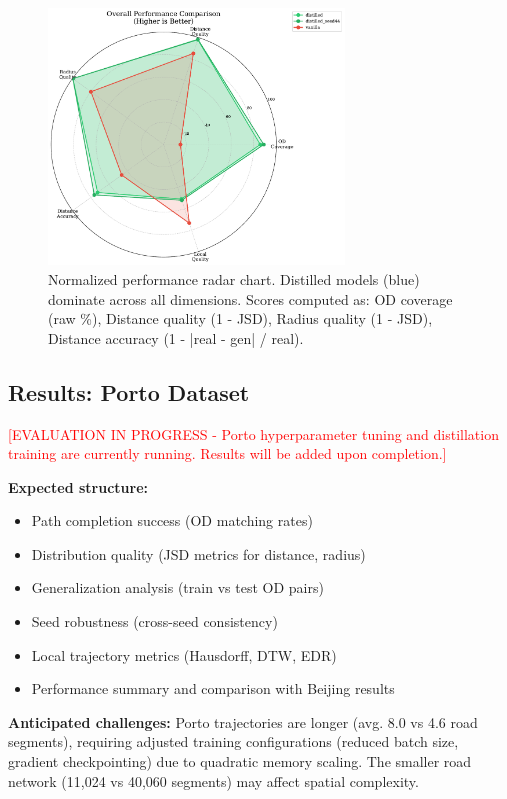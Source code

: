 \begin{figure}[h]
\centering
\includegraphics[width=0.7\textwidth]{assets/plots/hoser/performance_radar.pdf}
\caption{Normalized performance radar chart. Distilled models (blue) dominate across all dimensions. Scores computed as: OD coverage (raw \%), Distance quality (1 - JSD), Radius quality (1 - JSD), Distance accuracy (1 - |real - gen| / real).}
\label{fig:performance-radar}
\end{figure}

\subsection{Results: Porto Dataset}
\label{sec:eval-porto}

\textcolor{red}{[EVALUATION IN PROGRESS - Porto hyperparameter tuning and distillation training are currently running. Results will be added upon completion.]}

\textbf{Expected structure:}
\begin{itemize}[noitemsep,topsep=0pt]
\item Path completion success (OD matching rates)
\item Distribution quality (JSD metrics for distance, radius)
\item Generalization analysis (train vs test OD pairs)
\item Seed robustness (cross-seed consistency)
\item Local trajectory metrics (Hausdorff, DTW, EDR)
\item Performance summary and comparison with Beijing results
\end{itemize}

\textbf{Anticipated challenges:} Porto trajectories are longer (avg. 8.0 vs 4.6 road segments), requiring adjusted training configurations (reduced batch size, gradient checkpointing) due to quadratic memory scaling. The smaller road network (11,024 vs 40,060 segments) may affect spatial complexity.

